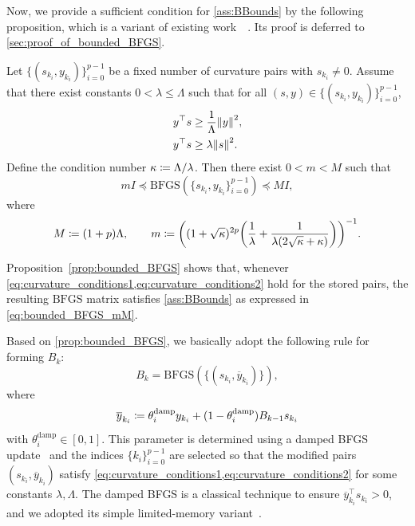 \documentclass[journal]{subfiles}
\begin{document}
Now, we provide a sufficient condition for \cref{ass:BBounds} by the following proposition, which is a variant of existing work~\citep[Theorem 5.5]{gaoQuasiNewtonMethodsSuperlinear2018}~\citep[Lemma 1]{gowerStochasticBlockBFGS2016}. Its proof is deferred to \cref{sec:proof_of_bounded_BFGS}.
\begin{proposition}\label{prop:bounded_BFGS}
    Let $\{(s_{k_i},y_{k_i})\}_{i=0}^{p-1}$ be a fixed number of curvature pairs with $s_{k_i} \neq 0$. Assume that there exist constants $0<\lambda \leq \Lambda$ such that for all $(s,y) \in \{(s_{k_i},y_{k_i})\}_{i=0}^{p-1}$,
    \begin{align}
        y^\top s & \ge \frac{1}{\Lambda}\norm{y}^2, \label{eq:curvature_conditions1} \\
        y^\top s & \ge \lambda\norm{s}^2. \label{eq:curvature_conditions2}
    \end{align}
    Define the condition number $\kappa\coloneqq\Lambda/\lambda$.
    Then there exist $0<m<M$ such that
    \begin{equation}\label{eq:bounded_BFGS_mM}
        mI\preceq \mathrm{BFGS}(\{s_{k_i},y_{k_i}\}_{i=0}^{p-1}) \preceq MI,
    \end{equation}
    where
    \begin{equation*}
        M\coloneqq(1+p)\Lambda,\qquad
        m\coloneqq\qty((1+\sqrt{\kappa})^{2p}\qty(\frac{1}{\lambda}+\frac{1}{\lambda(2\sqrt{\kappa}+\kappa)}))^{-1}.
    \end{equation*}
\end{proposition}
Proposition~\ref{prop:bounded_BFGS} shows that, whenever \cref{eq:curvature_conditions1,eq:curvature_conditions2} hold for the stored pairs, the resulting $\mathrm{BFGS}$ matrix satisfies \cref{ass:BBounds} as expressed in \cref{eq:bounded_BFGS_mM}.

Based on \cref{prop:bounded_BFGS}, we basically adopt the following rule for forming $B_k$:
\begin{equation}\label{eq:proposed_choice_of_Bk}
    B_k=\mathrm{BFGS}(\{(s_{k_i}, \overline{y}_{k_i})\}),
\end{equation}
where
\begin{equation*}
    \overline{y}_{k_i} \coloneqq \theta^{\mathrm{damp}}_i y_{k_i} + (1-\theta^{\mathrm{damp}}_i) B_{k-1}s_{k_i} \\
\end{equation*}
with $\theta^{\mathrm{damp}}_i \in [0,1]$.
This parameter is determined using a damped BFGS update~\citep{powellAlgorithmsNonlinearConstraints1978,lotfiStochasticDampedLBFGS2020} and the indices $\{k_i\}_{i=0}^{p-1}$ are selected so that the modified pairs $(s_{k_i},\overline y_{k_i})$ satisfy \cref{eq:curvature_conditions1,eq:curvature_conditions2} for some constants $\lambda, \Lambda$.
The damped BFGS is a classical technique to ensure $\overline y_{k_i}^\top s_{k_i}>0$, and we adopted its simple limited-memory variant~\citep{lotfiStochasticDampedLBFGS2020}.
\end{document}
